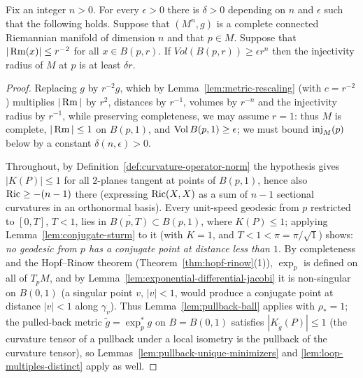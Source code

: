 \begin{theorem}
\label{thm:volume-injectivity-radius}

\label{volinj}

Fix an integer $n>0$. For every $\epsilon>0$ there is $\delta>0$
depending on $n$ and $\epsilon$ such that the following holds.
Suppose that $(M^n,g)$ is a complete connected Riemannian
manifold of dimension $n$ and that $p\in M$. Suppose that $|\operatorname{Rm}(x)|\le
r^{-2}$ for all $x\in B(p,r)$. If $Vol(B(p,r))\ge \epsilon r^n$ then
the injectivity radius of $M$ at $p$ is at least $\delta r$.
\end{theorem}

\begin{proof}
\sketch
{}
Replacing $g$ by $r^{-2}g$, which by
Lemma~\ref{lem:metric-rescaling} (with $c=r^{-2}$) multiplies
$|\operatorname{Rm}|$ by $r^{2}$,
distances by $r^{-1}$, volumes by $r^{-n}$ and the injectivity
radius by $r^{-1}$, while preserving completeness, we may assume
$r=1$: thus $M$ is
complete, $|\operatorname{Rm}|\le1$ on $B(p,1)$, and $\operatorname{Vol} B(p,1)\ge\epsilon$; we
must bound $\operatorname{inj}_M(p)$ below by a constant $\delta(n,\epsilon)>0$.

Throughout, by Definition~\ref{def:curvature-operator-norm} the
hypothesis gives $|K(P)|\le1$ for all $2$-planes tangent at points
of $B(p,1)$, hence also $\operatorname{Ric}\ge-(n-1)$ there (expressing
$\operatorname{Ric}(X,X)$ as a sum of $n-1$ sectional curvatures in an
orthonormal basis). Every unit-speed geodesic from $p$
restricted to $[0,T]$, $T<1$, lies in
$\overline{B(p,T)}\subset B(p,1)$, where $K(P)\le1$; applying
Lemma~\ref{lem:conjugate-sturm} to it (with $K=1$, and
$T<1<\pi=\pi/\sqrt{1}$)
shows: \emph{no geodesic from $p$ has a conjugate point at
distance less than $1$}. By
completeness and the Hopf--Rinow theorem
(Theorem~\ref{thm:hopf-rinow}(1)), $\exp_p$ is defined
on all of $T_pM$, and by
Lemma~\ref{lem:exponential-differential-jacobi} it is
non-singular on $B(0,1)$ (a singular point $v$, $|v|<1$, would
produce a conjugate point at distance $|v|<1$ along
$\gamma_v$). Thus
Lemma~\ref{lem:pullback-ball} applies with $\rho_*=1$; the
pulled-back metric $\tilde g=\exp_p^*g$ on $B=B(0,1)$
satisfies $|K_{\tilde g}(P)|\le1$ (the curvature tensor of a
pullback under a local isometry is the pullback of the curvature
tensor), so Lemmas~\ref{lem:pullback-unique-minimizers} and
\ref{lem:loop-multiples-distinct} apply as well.


\end{proof}
